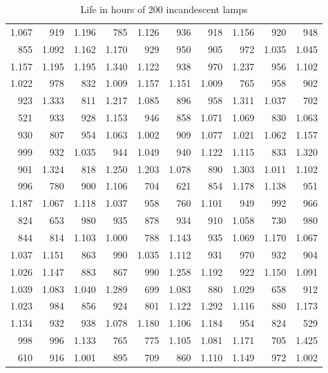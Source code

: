   \begin{table}[H]
    \centering
    \begin{tabular}{rrrrrrrrrr}
      1.067 & 919   & 1.196 & 785   & 1.126 & 936   & 918   & 1.156 & 920   & 948   \\
      855   & 1.092 & 1.162 & 1.170 & 929   & 950   & 905   & 972   & 1.035 & 1.045 \\
      1.157 & 1.195 & 1.195 & 1.340 & 1.122 & 938   & 970   & 1.237 & 956   & 1.102 \\
      1.022 & 978   & 832   & 1.009 & 1.157 & 1.151 & 1.009 & 765   & 958   & 902   \\
      923   & 1.333 & 811   & 1.217 & 1.085 & 896   & 958   & 1.311 & 1.037 & 702   \\
      521   & 933   & 928   & 1.153 & 946   & 858   & 1.071 & 1.069 & 830   & 1.063 \\
      930   & 807   & 954   & 1.063 & 1.002 & 909   & 1.077 & 1.021 & 1.062 & 1.157 \\
      999   & 932   & 1.035 & 944   & 1.049 & 940   & 1.122 & 1.115 & 833   & 1.320 \\
      901   & 1.324 & 818   & 1.250 & 1.203 & 1.078 & 890   & 1.303 & 1.011 & 1.102 \\
      996   & 780   & 900   & 1.106 & 704   & 621   & 854   & 1.178 & 1.138 & 951   \\
      1.187 & 1.067 & 1.118 & 1.037 & 958   & 760   & 1.101 & 949   & 992   & 966   \\
      824   & 653   & 980   & 935   & 878   & 934   & 910   & 1.058 & 730   & 980   \\
      844   & 814   & 1.103 & 1.000 & 788   & 1.143 & 935   & 1.069 & 1.170 & 1.067 \\
      1.037 & 1.151 & 863   & 990   & 1.035 & 1.112 & 931   & 970   & 932   & 904   \\
      1.026 & 1.147 & 883   & 867   & 990   & 1.258 & 1.192 & 922   & 1.150 & 1.091 \\
      1.039 & 1.083 & 1.040 & 1.289 & 699   & 1.083 & 880   & 1.029 & 658   & 912   \\
      1.023 & 984   & 856   & 924   & 801   & 1.122 & 1.292 & 1.116 & 880   & 1.173 \\
      1.134 & 932   & 938   & 1.078 & 1.180 & 1.106 & 1.184 & 954   & 824   & 529   \\
      998   & 996   & 1.133 & 765   & 775   & 1.105 & 1.081 & 1.171 & 705   & 1.425 \\
      610   & 916   & 1.001 & 895   & 709   & 860   & 1.110 & 1.149 & 972   & 1.002 \\
    \end{tabular}
    \caption{Life in hours of 200 incandescent lamps}
    \label{tbl:file-in-hours-of-200-incandescent-lamps}
  \end{table}
